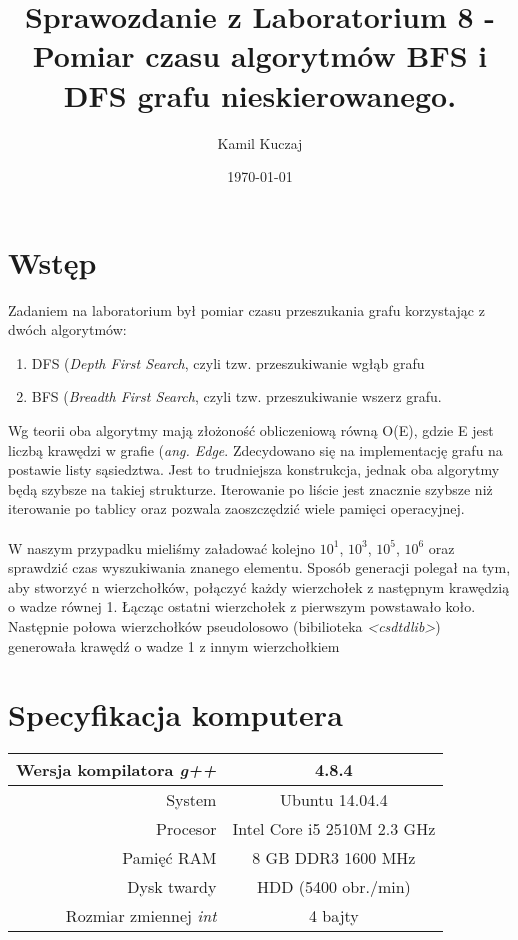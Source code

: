 \documentclass[11pt,a4paper]{article}
\author{Kamil Kuczaj}
\title{Sprawozdanie z Laboratorium 8 - Pomiar czasu algorytmów BFS i DFS grafu nieskierowanego.}
\date{\today}
\begin{document}
\maketitle

\section{Wstęp}
\hspace{4ex}Zadaniem na laboratorium był pomiar czasu przeszukania grafu korzystając z dwóch algorytmów:
\begin{enumerate}
\item DFS (\textit{Depth First Search}, czyli tzw. przeszukiwanie wgłąb grafu
\item BFS (\textit{Breadth First Search}, czyli tzw. przeszukiwanie wszerz grafu.
\end{enumerate} Wg teorii oba algorytmy mają złożoność obliczeniową równą O(E), gdzie E jest liczbą krawędzi w grafie (\textit{ang. Edge}. Zdecydowano się na implementację grafu na postawie listy sąsiedztwa. Jest to trudniejsza konstrukcja, jednak oba algorytmy będą szybsze na takiej strukturze. Iterowanie po liście jest znacznie szybsze niż iterowanie po tablicy oraz pozwala zaoszczędzić wiele pamięci operacyjnej.\\\\W naszym przypadku mieliśmy załadować kolejno $10^1$, $10^3$, $10^5$, $10^6$ oraz sprawdzić czas wyszukiwania znanego elementu. Sposób generacji polegał na tym, aby stworzyć n wierzchołków, połączyć każdy wierzchołek z następnym krawędzią o wadze równej 1. Łącząc ostatni wierzchołek z pierwszym powstawało koło. Następnie połowa wierzchołków pseudolosowo (bibilioteka \textit{<csdtdlib>}) generowała krawędź o wadze 1 z innym wierzchołkiem
\section{Specyfikacja komputera}

\begin{center}
	\begin{tabular}{| r | c |}
	\hline
	Wersja kompilatora \textit{g++} & 4.8.4 \\ \hline
	System & Ubuntu 14.04.4 \\ \hline
	Procesor	 & Intel Core i5 2510M 2.3 GHz \\ \hline
	Pamięć RAM & 8 GB DDR3 1600 MHz \\ \hline
	Dysk twardy & HDD (5400 obr./min) \\ \hline
	Rozmiar zmiennej \textit{int} & 4 bajty \\ \hline
	\end{tabular}
\end{center}
\end{document}
